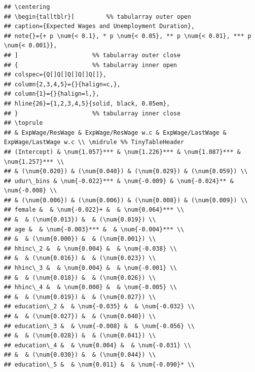\documentclass[
]{article}
\begin{document}
\begin{verbatim}
## \centering
## \begin{talltblr}[         %% tabularray outer open
## caption={Expected Wages and Unemployment Duration},
## note{}={+ p \num{< 0.1}, * p \num{< 0.05}, ** p \num{< 0.01}, *** p \num{< 0.001}},
## ]                     %% tabularray outer close
## {                     %% tabularray inner open
## colspec={Q[]Q[]Q[]Q[]Q[]},
## column{2,3,4,5}={}{halign=c,},
## column{1}={}{halign=l,},
## hline{26}={1,2,3,4,5}{solid, black, 0.05em},
## }                     %% tabularray inner close
## \toprule
## & ExpWage/ResWage & ExpWage/ResWage w.c & ExpWage/LastWage & ExpWage/LastWage w.c \\ \midrule %% TinyTableHeader
## (Intercept) & \num{1.057}*** & \num{1.226}*** & \num{1.087}*** & \num{1.257}*** \\
## & (\num{0.020}) & (\num{0.040}) & (\num{0.029}) & (\num{0.059}) \\
## udur\_bins & \num{-0.022}*** & \num{-0.009} & \num{-0.024}** & \num{-0.008} \\
## & (\num{0.006}) & (\num{0.006}) & (\num{0.008}) & (\num{0.009}) \\
## female &  & \num{-0.022}+ &  & \num{0.064}*** \\
## &  & (\num{0.013}) &  & (\num{0.019}) \\
## age &  & \num{-0.003}*** &  & \num{-0.004}*** \\
## &  & (\num{0.000}) &  & (\num{0.001}) \\
## hhinc\_2 &  & \num{0.004} &  & \num{-0.038} \\
## &  & (\num{0.016}) &  & (\num{0.023}) \\
## hhinc\_3 &  & \num{0.004} &  & \num{-0.001} \\
## &  & (\num{0.018}) &  & (\num{0.026}) \\
## hhinc\_4 &  & \num{0.000} &  & \num{-0.005} \\
## &  & (\num{0.019}) &  & (\num{0.027}) \\
## education\_2 &  & \num{-0.035} &  & \num{-0.032} \\
## &  & (\num{0.027}) &  & (\num{0.040}) \\
## education\_3 &  & \num{-0.008} &  & \num{-0.056} \\
## &  & (\num{0.028}) &  & (\num{0.041}) \\
## education\_4 &  & \num{0.004} &  & \num{-0.031} \\
## &  & (\num{0.030}) &  & (\num{0.044}) \\
## education\_5 &  & \num{0.011} &  & \num{-0.090}* \\

\end{verbatim}
\end{document}
